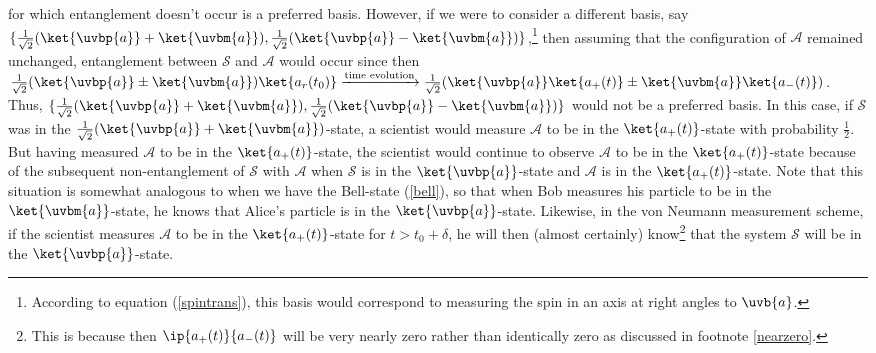     for which entanglement doesn't occur is a preferred basis. However, if we were to consider a different basis, say $\{\frac{1}{\sqrt{2}}(\ket{\uvbp{a}}+\ket{\uvbm{a}}), \frac{1}{\sqrt{2}}(\ket{\uvbp{a}}-\ket{\uvbm{a}})\}$,\footnote{According to equation (\ref{spintrans}), this basis would correspond to measuring the spin in an axis at right angles to 
    $\uvb{a}$.} then assuming that the configuration of $\mathcal{A}$ remained unchanged, entanglement between $\mathcal{S}$ and $\mathcal{A}$ would occur since then 
    $\frac{1}{\sqrt{2}}(\ket{\uvbp{a}}\pm\ket{\uvbm{a}})\ket{a_r(t_0)}\xrightarrow{\text{time evolution}}\frac{1}{\sqrt{2}}(\ket{\uvbp{a}}\ket{a_+(t)}\pm\ket{\uvbm{a}}\ket{a_-(t)})$. Thus, $\{\frac{1}{\sqrt{2}}(\ket{\uvbp{a}}+\ket{\uvbm{a}}), \frac{1}{\sqrt{2}}(\ket{\uvbp{a}}-\ket{\uvbm{a}})\}$ would not be a preferred basis. In this case, if  $\mathcal{S}$ was in the $\frac{1}{\sqrt{2}}(\ket{\uvbp{a}}+\ket{\uvbm{a}})$-state, a scientist would measure $\mathcal{A}$ to be in the $\ket{a_+(t)}$-state with probability $\frac{1}{2}$. But having measured $\mathcal{A}$ to be in the $\ket{a_+(t)}$-state, the scientist would continue to observe $\mathcal{A}$ to be in the $\ket{a_+(t)}$-state because of the subsequent non-entanglement of $\mathcal{S}$ with $\mathcal{A}$ when $\mathcal{S}$ is in the   $\ket{\uvbp{a}}$-state and $\mathcal{A}$ is in the $\ket{a_+(t)}$-state. Note that this situation is somewhat analogous to when we have the Bell-state (\ref{bell}), so that when Bob measures his particle to be in the $\ket{\uvbm{a}}$-state, he knows that Alice's particle is in the $\ket{\uvbp{a}}$-state. Likewise, in the von Neumann measurement scheme, if the scientist measures $\mathcal{A}$ to be in the $\ket{a_+(t)}$-state for $t>t_0+\delta$, he will then (almost certainly) know\footnote{This is because then $\ip{a_+(t)}{a_-(t)}$ will be very nearly zero rather than identically zero as discussed in footnote \ref{nearzero}.} that the system $\mathcal{S}$ will be in the $\ket{\uvbp{a}}$-state.
    
